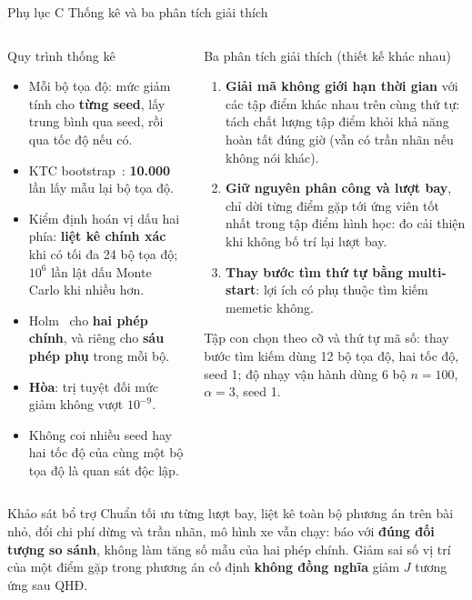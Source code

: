 \documentclass[aspectratio=169,10pt,t,xcolor={table}]{beamer}
\newcommand{\apptitle}[2]{Phụ lục #1 \textperiodcentered{} #2}
\begin{document}
\begin{frame}{\apptitle{C}{Thống kê và ba phân tích giải thích}}
\begin{columns}[T,onlytextwidth]
\begin{block}{Quy trình thống kê}
\scriptsize
\begin{itemize}
\item Mỗi bộ tọa độ: mức giảm tính cho \textbf{từng seed}, lấy trung bình qua seed, rồi qua tốc độ nếu có.
\item KTC bootstrap~\cite{efron1979}: \textbf{10.000} lần lấy mẫu lại bộ tọa độ.
\item Kiểm định hoán vị dấu hai phía: \textbf{liệt kê chính xác} khi có tối đa 24 bộ tọa độ; $10^6$ lần lật dấu Monte Carlo khi nhiều hơn.
\item Holm~\cite{holm1979} cho \textbf{hai phép chính}, và riêng cho \textbf{sáu phép phụ} trong mỗi bộ.
\item \textbf{Hòa}: trị tuyệt đối mức giảm không vượt $10^{-9}$.
\item Không coi nhiều seed hay hai tốc độ của cùng một bộ tọa độ là quan sát độc lập.
\end{itemize}
\end{block}
\begin{block}{Ba phân tích giải thích (thiết kế khác nhau)}
\scriptsize
\begin{enumerate}
\item \textbf{Giải mã không giới hạn thời gian} với các tập điểm khác nhau trên cùng thứ tự: tách chất lượng tập điểm khỏi khả năng hoàn tất đúng giờ (vẫn có trần nhãn nếu không nói khác).
\item \textbf{Giữ nguyên phân công và lượt bay}, chỉ dời từng điểm gặp tới ứng viên tốt nhất trong tập điểm hình học: đo cải thiện khi không bố trí lại lượt bay.
\item \textbf{Thay bước tìm thứ tự bằng multi-start}: lợi ích có phụ thuộc tìm kiếm memetic không.
\end{enumerate}
Tập con chọn theo cỡ và thứ tự mã số: thay bước tìm kiếm dùng 12 bộ tọa độ, hai tốc độ, seed 1; độ nhạy vận hành dùng 6 bộ $n=100$, $\alpha=3$, seed 1.
\end{block}
\end{columns}
\vspace{2pt}
\begin{alertblock}{Khảo sát bổ trợ}
\scriptsize Chuẩn tối ưu từng lượt bay, liệt kê toàn bộ phương án trên bài nhỏ, đổi chi phí dừng và trần nhãn, mô hình xe vẫn chạy: báo với \textbf{đúng đối tượng so sánh}, không làm tăng số mẫu của hai phép chính. Giảm sai số vị trí của một điểm gặp trong phương án cố định \textbf{không đồng nghĩa} giảm $J$ tương ứng sau QHĐ.
\end{alertblock}
\end{frame}
\end{document}
